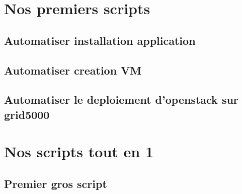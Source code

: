 \documentclass{report}
\begin{document}
            
    \section{Nos premiers scripts}
        \subsection{Automatiser installation application}
            
            
            
        \subsection{Automatiser creation VM}
            
        \subsection{Automatiser le deploiement d'openstack sur grid5000}
            
            
            
            
            
    \section{Nos scripts tout en 1}
        \subsection{Premier gros script}
            
\end{document}
